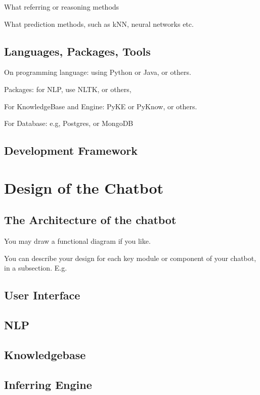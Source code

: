 \documentclass[11pt]{article}
\begin{document}
	What referring or reasoning methods
	
	What prediction methods, such as kNN, neural networks etc. 
	
	\subsection{Languages, Packages, Tools}
	
	On programming language: using Python or Java, or others. 
	
	Packages: for NLP, use NLTK\citep{NLTK}, or others, 
	
	For KnowledgeBase and Engine: PyKE or PyKnow, or others. 
	
	For Database: e.g, Postgres, or MongoDB     
	
	\subsection{Development Framework}
	
	
	\section{Design of the Chatbot}	
	
	\subsection{The Architecture of the chatbot}
	You may draw a functional diagram if you like.  
	
	You can describe your design for each key module or component of your chatbot, in a subsection. E.g. 
	\subsection{User Interface} 
	
	\subsection{NLP}
	
	\subsection{Knowledgebase}
	
	\subsection{Inferring Engine}
	
\end{document}
